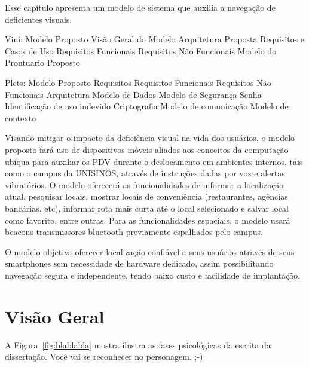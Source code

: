 \documentclass[english,brazilian]{UNISINOSmonografia}
\begin{document}
Esse capítulo apresenta um modelo de sistema que auxilia a navegação de deficientes visuais.


Vini:
Modelo Proposto
	Visão Geral do Modelo
	Arquitetura Proposta
	Requisitos e Casos de Uso
		Requisitos Funcionais
		Requisitos Não Funcionais
	Modelo do Prontuario Proposto


Plets:
Modelo Proposto
	Requisitos
		Requisitos Funcionais
		Requisitos Não Funcionais
	Arquitetura
	Modelo de Dados
	Modelo de Segurança
		Senha
		Identificação de uso indevido
		Criptografia
	Modelo de comunicação
	Modelo de contexto


Visando mitigar o impacto da deficiência visual na vida dos usuários, o modelo proposto fará uso de dispositivos móveis aliados aos conceitos da computação ubíqua para auxiliar os PDV durante o deslocamento em ambientes internos, tais como o campus da UNISINOS, através de instruções dadas por voz e alertas vibratórios. O modelo oferecerá as funcionalidades de informar a localização atual, pesquisar locais, mostrar locais de conveniência (restaurantes, agências bancárias, etc), informar rota mais curta até o local selecionado e salvar local como favorito, entre outras. Para as funcionalidades espaciais, o modelo usará beacons transmissores bluetooth previamente espalhados pelo campus.

O modelo objetiva oferecer localização confiável a seus usuários através de seus smartphones sem necessidade de hardware dedicado, assim possibilitando navegação segura e independente, tendo baixo custo e facilidade de implantação.

	\section{Visão Geral}

A Figura~\ref{fig:blablabla} mostra ilustra as fases psicológicas da escrita da dissertação. Você vai se reconhecer no personagem. ;-)
\end{document}

